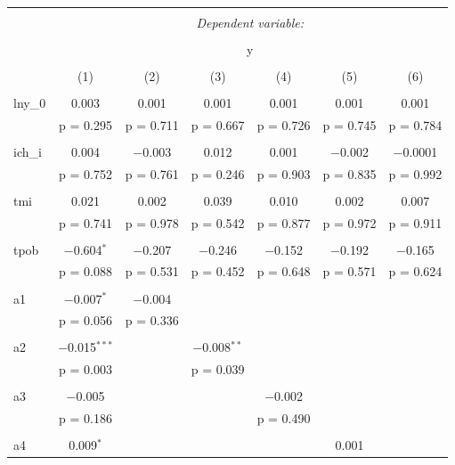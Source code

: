 \begin{table}[!htbp] \centering 
    \tiny
  \caption{} 
  \label{} 
\begin{tabular}{@{\extracolsep{5pt}}lcccccc} 
\\[-1.8ex]\hline 
\hline \\[-1.8ex] 
 & \multicolumn{6}{c}{\textit{Dependent variable:}} \\ 
\cline{2-7} 
\\[-1.8ex] & \multicolumn{6}{c}{y} \\ 
\\[-1.8ex] & (1) & (2) & (3) & (4) & (5) & (6)\\ 
\hline \\[-1.8ex] 
 lny\_0 & 0.003 & 0.001 & 0.001 & 0.001 & 0.001 & 0.001 \\ 
  & p = 0.295 & p = 0.711 & p = 0.667 & p = 0.726 & p = 0.745 & p = 0.784 \\ 
  & & & & & & \\ 
 ich\_i & 0.004 & $-$0.003 & 0.012 & 0.001 & $-$0.002 & $-$0.0001 \\ 
  & p = 0.752 & p = 0.761 & p = 0.246 & p = 0.903 & p = 0.835 & p = 0.992 \\ 
  & & & & & & \\ 
 tmi & 0.021 & 0.002 & 0.039 & 0.010 & 0.002 & 0.007 \\ 
  & p = 0.741 & p = 0.978 & p = 0.542 & p = 0.877 & p = 0.972 & p = 0.911 \\ 
  & & & & & & \\ 
 tpob & $-$0.604$^{*}$ & $-$0.207 & $-$0.246 & $-$0.152 & $-$0.192 & $-$0.165 \\ 
  & p = 0.088 & p = 0.531 & p = 0.452 & p = 0.648 & p = 0.571 & p = 0.624 \\ 
  & & & & & & \\ 
 a1 & $-$0.007$^{*}$ & $-$0.004 &  &  &  &  \\ 
  & p = 0.056 & p = 0.336 &  &  &  &  \\ 
  & & & & & & \\ 
 a2 & $-$0.015$^{***}$ &  & $-$0.008$^{**}$ &  &  &  \\ 
  & p = 0.003 &  & p = 0.039 &  &  &  \\ 
  & & & & & & \\ 
 a3 & $-$0.005 &  &  & $-$0.002 &  &  \\ 
  & p = 0.186 &  &  & p = 0.490 &  &  \\ 
  & & & & & & \\ 
 a4 & 0.009$^{*}$ &  &  &  & 0.001 &  \\ 

\end{tabular}
\end{table}
